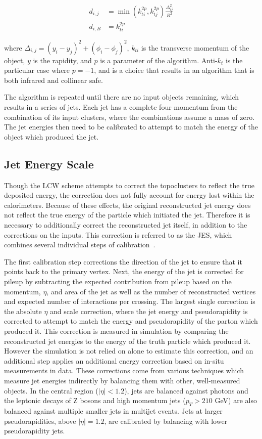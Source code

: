\begin{align}\label{eq:antikt}
d_{i,j} &= \min(k_{ti}^{2p}, k_{tj}^{2p}) \frac{\Delta_{ij}^2}{R^2} \\
d_{i,B} &= k_{ti}^{2p}
\end{align}

where $\Delta_{i,j} = (y_i - y_j)^2 + (\phi_i - \phi_j)^2$, $k_{ti}$ is the transverse momentum of the object, $y$ is the rapidity, and $p$ is a parameter of the algorithm.
Anti-$k_t$ is the particular case where $p = -1$, and is a choice that results in an algorithm that is both infrared and collinear safe.

The algorithm is repeated until there are no input objects remaining, which results in a series of jets. 
Each jet has a complete four momentum from the combination of its input clusters, where the combinations assume a mass of zero.
The jet energies then need to be calibrated to attempt to match the energy of the object which produced the jet.

\subsection{Jet Energy Scale}
\label{sec:reco_jes}

Though the \ac{LCW} scheme attempts to correct the topoclusters to reflect the true deposited energy, the correction does not fully account for energy lost within the calorimeters.
Because of these effects, the original reconstructed jet energy does not reflect the true energy of the particle which initiated the jet.
Therefore it is necessary to additionally correct the reconstructed jet itself, in addition to the corrections on the inputs.
This correction is referred to as the \ac{JES}, which combines several individual steps of calibration~\cite{ATLAS-CONF-2015-002}.

The first calibration step corrections the direction of the jet to ensure that it points back to the primary vertex.
Next, the energy of the jet is corrected for pileup by subtracting the expected contribution from pileup based on the momentum, $\eta$, and area of the jet as well as the number of reconstructed vertices and expected number of interactions per crossing.
The largest single correction is the absolute $\eta$ and scale correction, where the jet energy and pseudorapidity is corrected to attempt to match the energy and pseudorapidity of the parton which produced it.
This correction is measured in simulation by comparing the reconstructed jet energies to the energy of the truth particle which produced it.
However the simulation is not relied on alone to estimate this correction, and an additional step applies an additional energy correction based on in-situ measurements in data.
These corrections come from various techniques which measure jet energies indirectly by balancing them with other, well-measured objects.
In the central region ($|\eta| < 1.2$), jets are balanced against photons and the leptonic decays of Z bosons and high momentum jets ($p_T > 210$ GeV) are also balanced against multiple smaller jets in multijet events.
Jets at larger pseudorapidities, above $|\eta| = 1.2$, are calibrated by balancing with lower pseudorapidity jets.

